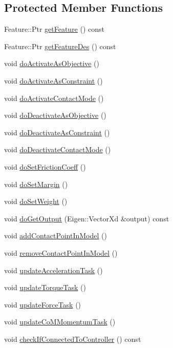 \subsection*{Protected Member Functions}
\begin{DoxyCompactItemize}
\item 
Feature\+::\+Ptr \hyperlink{classocra_1_1Task_a18b2e326e85a6bbf8ff4e22be7a413da}{get\+Feature} () const
\item 
Feature\+::\+Ptr \hyperlink{classocra_1_1Task_a6f723dae3dfd819844638adca4ac818f}{get\+Feature\+Des} () const
\item 
void \hyperlink{classocra_1_1Task_ac5b5ad719f9a34bdc0a275804b4c50f3}{do\+Activate\+As\+Objective} ()
\item 
void \hyperlink{classocra_1_1Task_ae1d786b51c24d56c4e2d800e422ebc75}{do\+Activate\+As\+Constraint} ()
\item 
void \hyperlink{classocra_1_1Task_acbee7ddb69459ff0d2e450dbe6195b49}{do\+Activate\+Contact\+Mode} ()
\item 
void \hyperlink{classocra_1_1Task_af2874b0d97d3fb735dc5a49c0f80a717}{do\+Deactivate\+As\+Objective} ()
\item 
void \hyperlink{classocra_1_1Task_a9f7261991e6aa056a02ec7f3dd4ea72a}{do\+Deactivate\+As\+Constraint} ()
\item 
void \hyperlink{classocra_1_1Task_a98cfb17f9df4e27b5c1d9cc2bf0faa9e}{do\+Deactivate\+Contact\+Mode} ()
\item 
void \hyperlink{classocra_1_1Task_a575fdd8324142d60096bcb4e41b70d6a}{do\+Set\+Friction\+Coeff} ()
\item 
void \hyperlink{classocra_1_1Task_a3c7c2460b3e60764349fe5ad331e41d6}{do\+Set\+Margin} ()
\item 
void \hyperlink{classocra_1_1Task_a9a2c1a965f429ec5a3a756e8a1aeff37}{do\+Set\+Weight} ()
\item 
void \hyperlink{classocra_1_1Task_a96981db9ec0975c321ab46d182d3f6d8}{do\+Get\+Output} (Eigen\+::\+Vector\+Xd \&output) const
\item 
void \hyperlink{classocra_1_1Task_ad09f069ad2649ebe9eb2d51f49b2c531}{add\+Contact\+Point\+In\+Model} ()
\item 
void \hyperlink{classocra_1_1Task_a5dc76ab144162dd2960999c19510033f}{remove\+Contact\+Point\+In\+Model} ()
\item 
void \hyperlink{classocra_1_1Task_a3660b0a6149ae5472d00dab4f2799dfc}{update\+Acceleration\+Task} ()
\item 
void \hyperlink{classocra_1_1Task_a484d8cb46cd388b065b5d9cd03fa4caa}{update\+Torque\+Task} ()
\item 
void \hyperlink{classocra_1_1Task_a49af52acac5f23a6fc51c071271ae6ea}{update\+Force\+Task} ()
\item 
void \hyperlink{classocra_1_1Task_a2cfddc40424cb0edd08defe5df48addf}{update\+Co\+M\+Momentum\+Task} ()
\item 
void \hyperlink{classocra_1_1Task_adb083abedac149db35284554d6a73b8f}{check\+If\+Connected\+To\+Controller} () const
\end{DoxyCompactItemize}


